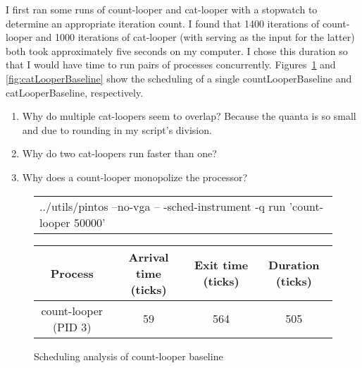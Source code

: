 \documentclass{article}
\newcommand{\command}[1]{{\sffamily#1}}
\begin{document}
I first ran some runs of \command{count-looper} and \command{cat-looper} with a stopwatch
to determine an appropriate iteration count. I found that \num{1400} iterations of \command{count-looper}
and \num{1000} iterations of \command{cat-looper} (with  serving as the input for the latter) both took approximately five seconds
on my computer.
I chose this duration so that I would have time to run pairs of processes concurrently.
Figures~\ref{fig:countLooperBaseline} and \ref{fig:catLooperBaseline} show
the scheduling of a single \command{countLooperBaseline} and \command{catLooperBaseline},
respectively.

\color{red}
\begin{enumerate}
\item Why do multiple \command{cat-looper}s seem to overlap? Because the quanta is so small and due to rounding in my script's division.
\item Why do two \command{cat-looper}s run faster than one?
\item Why does a \command{count-looper} monopolize the processor?
\end{enumerate}
\color{black}

\begin{landscape}
\begin{figure}
\centering

\begin{tabular}{l}
\command{../utils/pintos --no-vga -- -sched-instrument -q run 'count-looper 50000'}
\end{tabular}

\vspace{1em}



\vspace{1em}

\begin{tabular}{cccc}\toprule
Process & Arrival time (ticks) & Exit time (ticks) & Duration (ticks)\\\hline
\command{count-looper} (PID 3) & \num{59} & \num{564} & \num{505} \\\bottomrule
\end{tabular}
\caption{Scheduling analysis of count-looper baseline}
\label{fig:countLooperBaseline}
\end{figure}
\end{landscape}
\end{document}
